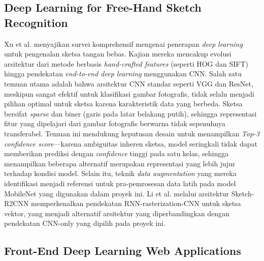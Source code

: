 \documentclass[12pt,a4paper,oneside,openany]{report}
\begin{document}
\subsection{Deep Learning for Free-Hand Sketch Recognition}
\label{subsec:penelitian-sketch}

Xu et al. \cite{ref6} menyajikan survei komprehensif mengenai penerapan \textit{deep learning} untuk pengenalan sketsa tangan bebas. Kajian mereka mencakup evolusi arsitektur dari metode berbasis \textit{hand-crafted features} (seperti HOG dan SIFT) hingga pendekatan \textit{end-to-end deep learning} menggunakan CNN. Salah satu temuan utama adalah bahwa arsitektur CNN standar seperti VGG dan ResNet, meskipun sangat efektif untuk klasifikasi gambar fotografis, tidak selalu menjadi pilihan optimal untuk sketsa karena karakteristik data yang berbeda. Sketsa bersifat \textit{sparse} dan biner (garis pada latar belakang putih), sehingga representasi fitur yang dipelajari dari gambar fotografis berwarna tidak sepenuhnya transferabel. Temuan ini mendukung keputusan desain untuk menampilkan \textit{Top-3 confidence score}---karena ambiguitas inheren sketsa, model seringkali tidak dapat memberikan prediksi dengan \textit{confidence} tinggi pada satu kelas, sehingga menampilkan beberapa alternatif merupakan representasi yang lebih jujur terhadap kondisi model. Selain itu, teknik \textit{data augmentation} yang mereka identifikasi menjadi referensi untuk pra-pemrosesan data latih pada model MobileNet yang digunakan dalam proyek ini. Li et al. \cite{ref27} melalui arsitektur Sketch-R2CNN memperkenalkan pendekatan RNN-rasterization-CNN untuk sketsa vektor, yang menjadi alternatif arsitektur yang diperbandingkan dengan pendekatan CNN-only yang dipilih pada proyek ini.

\subsection{Front-End Deep Learning Web Applications}
\label{subsec:penelitian-frontend-dl}
\end{document}
